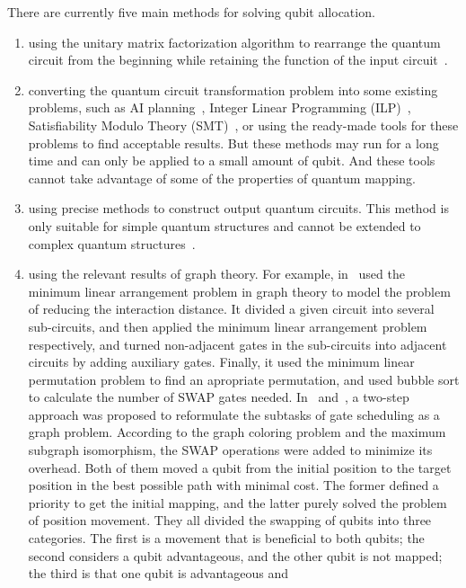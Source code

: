 \documentclass[runningheads]{llncs}
\begin{document}
There are currently five main methods for solving qubit allocation.
\begin{enumerate}
	\item using the unitary matrix factorization algorithm to rearrange 
the quantum circuit from the beginning while retaining the function of the input 
circuit~\cite{2019CNOT,2019Quantum}.
	\item converting the quantum circuit transformation problem into 
	some existing problems, such as AI planning~\cite{2017Temporal,2018Integer}, 
	Integer Linear Programming (ILP)~\cite{2019Almeida}, 
	Satisfiability Modulo Theory (SMT)~\cite{2019Murali}, 
	or using the ready-made tools for these problems to find acceptable results.
	But these methods may run for a long time and 
	can only be applied to a small amount of qubit. 
	And these tools cannot take advantage of some of the properties of quantum mapping.
	\item using precise methods to construct output quantum circuits. 
	This method is only suitable for simple quantum structures and cannot be extended to 
	complex quantum structures~\cite{2018QubitSiraichi}.
	\item using the relevant results of graph theory.
	For example, in~\cite{Shafaei2013}  used the minimum linear arrangement problem in graph theory 
   to model the problem of reducing the interaction distance.
   It divided a given circuit into several sub-circuits, 
   and then applied the minimum linear arrangement problem respectively, 
   and turned non-adjacent gates in the sub-circuits into adjacent circuits 
   by adding auxiliary gates.
   Finally, it used the minimum linear permutation problem to find an apropriate permutation, 
   and used bubble sort to calculate the number of SWAP gates needed.
   In~\cite{Guerreschi2018} and~\cite{Matsuo2019}, 
   a two-step approach was proposed to reformulate the subtasks 
   of gate scheduling as a graph problem.
   According to the graph coloring problem and the maximum subgraph isomorphism,
   the SWAP operations were added to minimize its overhead.
   Both of them moved a qubit from the initial position to 
   the target position in the best possible path with minimal cost.
   The former defined a priority to get the initial mapping, 
   and the latter purely solved the problem of position movement. 
   They all divided the swapping of qubits into three categories. 
   The first is a movement that is beneficial to both qubits; 
   the second considers a qubit advantageous, 
   and the other qubit is not mapped; 
   the third is that one qubit is advantageous and 

\end{enumerate}
\end{document}
